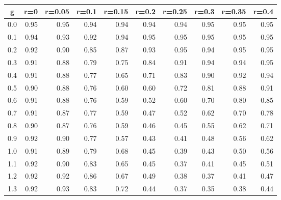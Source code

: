 %
\begin{table}[!tbp]
 \begin{center}
 \begin{tabular}{rrrrrrrrrr}\hline\hline
\multicolumn{1}{c}{g}&\multicolumn{1}{c}{r=0}&\multicolumn{1}{c}{r=0.05}&\multicolumn{1}{c}{r=0.1}&\multicolumn{1}{c}{r=0.15}&\multicolumn{1}{c}{r=0.2}&\multicolumn{1}{c}{r=0.25}&\multicolumn{1}{c}{r=0.3}&\multicolumn{1}{c}{r=0.35}&\multicolumn{1}{c}{r=0.4}\tabularnewline
\hline
0.0&0.95&0.95&0.94&0.94&0.94&0.94&0.95&0.95&0.95\tabularnewline
0.1&0.94&0.93&0.92&0.94&0.95&0.95&0.95&0.95&0.95\tabularnewline
0.2&0.92&0.90&0.85&0.87&0.93&0.95&0.94&0.95&0.95\tabularnewline
0.3&0.91&0.88&0.79&0.75&0.84&0.91&0.94&0.94&0.95\tabularnewline
0.4&0.91&0.88&0.77&0.65&0.71&0.83&0.90&0.92&0.94\tabularnewline
0.5&0.90&0.88&0.76&0.60&0.60&0.72&0.81&0.88&0.91\tabularnewline
0.6&0.91&0.88&0.76&0.59&0.52&0.60&0.70&0.80&0.85\tabularnewline
0.7&0.91&0.87&0.77&0.59&0.47&0.52&0.62&0.70&0.78\tabularnewline
0.8&0.90&0.87&0.76&0.59&0.46&0.45&0.55&0.62&0.71\tabularnewline
0.9&0.92&0.90&0.77&0.57&0.43&0.41&0.48&0.56&0.62\tabularnewline
1.0&0.91&0.89&0.79&0.68&0.45&0.39&0.43&0.50&0.56\tabularnewline
1.1&0.92&0.90&0.83&0.65&0.45&0.37&0.41&0.45&0.51\tabularnewline
1.2&0.92&0.92&0.86&0.67&0.49&0.38&0.37&0.41&0.47\tabularnewline
1.3&0.92&0.93&0.83&0.72&0.44&0.37&0.35&0.38&0.44\tabularnewline
\hline
\end{tabular}

\end{center}

\end{table}

